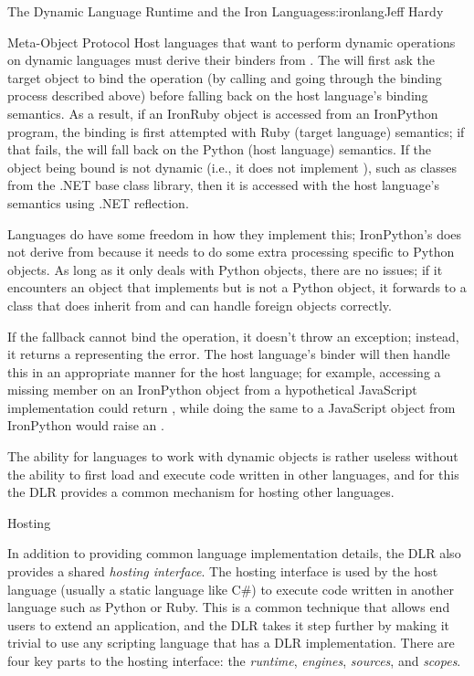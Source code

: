 \begin{aosachapter}{The Dynamic Language Runtime and the Iron Languages}{s:ironlang}{Jeff Hardy}
\begin{aosasect1}{Meta-Object Protocol}
Host languages that want to perform dynamic operations on dynamic languages
must derive their binders from . The
 will first ask the target object to bind the
operation (by calling  and going through the binding
process described above) before falling back on the host language's binding
semantics. As a result, if an IronRuby object is accessed from an IronPython
program, the binding is first attempted with Ruby (target language) semantics;
if that fails, the  will fall back on the Python
(host language) semantics. If the object being bound is not dynamic (i.e., it
does not implement ), such as classes from the
.NET base class library, then it is accessed with the host language's semantics
using .NET reflection.

Languages do have some freedom in how they implement this; IronPython's
 does not derive from  because it
needs to do some extra processing specific to Python objects. As long as it
only deals with Python objects, there are no issues; if it encounters an object
that implements  but is not a Python object,
it forwards to a  class that does inherit from
 and can handle foreign objects correctly.

If the fallback cannot bind the operation, it doesn't throw an
exception; instead, it returns a  representing the
error. The host language's binder will then handle this in an appropriate
manner for the host language; for example, accessing a missing member on an
IronPython object from a hypothetical JavaScript implementation could return
, while doing the same to a JavaScript object from IronPython
would raise an .

The ability for languages to work with dynamic objects is rather useless
without the ability to first load and execute code written in other languages,
and for this the DLR provides a common mechanism for hosting other languages.

\end{aosasect1}

\begin{aosasect1}{Hosting}

In addition to providing common language implementation details, the DLR also
provides a shared \emph{hosting interface}. The hosting interface is used by
the host language (usually a static language like C\#) to execute code written
in another language such as Python or Ruby. This is a common technique that
allows end users to extend an application, and the DLR takes it step further by
making it trivial to use any scripting language that has a DLR implementation.
There are four key parts to the hosting interface: the \emph{runtime}, 
\emph{engines}, \emph{sources},  and \emph{scopes}.


\end{aosasect1}
\end{aosachapter}
